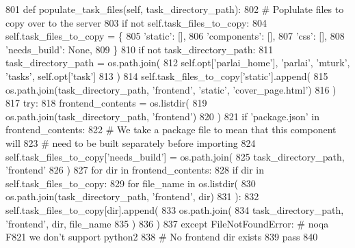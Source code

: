 \begin{DoxyCode}
801     \textcolor{keyword}{def }populate\_task\_files(self, task\_directory\_path):
802         \textcolor{comment}{# Poplulate files to copy over to the server}
803         \textcolor{keywordflow}{if} \textcolor{keywordflow}{not} self.task\_files\_to\_copy:
804             self.task\_files\_to\_copy = \{
805                 \textcolor{stringliteral}{'static'}: [],
806                 \textcolor{stringliteral}{'components'}: [],
807                 \textcolor{stringliteral}{'css'}: [],
808                 \textcolor{stringliteral}{'needs\_build'}: \textcolor{keywordtype}{None},
809             \}
810         \textcolor{keywordflow}{if} \textcolor{keywordflow}{not} task\_directory\_path:
811             task\_directory\_path = os.path.join(
812                 self.opt[\textcolor{stringliteral}{'parlai\_home'}], \textcolor{stringliteral}{'parlai'}, \textcolor{stringliteral}{'mturk'}, \textcolor{stringliteral}{'tasks'}, self.opt[\textcolor{stringliteral}{'task'}]
813             )
814         self.task\_files\_to\_copy[\textcolor{stringliteral}{'static'}].append(
815             os.path.join(task\_directory\_path, \textcolor{stringliteral}{'frontend'}, \textcolor{stringliteral}{'static'}, \textcolor{stringliteral}{'cover\_page.html'})
816         )
817         \textcolor{keywordflow}{try}:
818             frontend\_contents = os.listdir(
819                 os.path.join(task\_directory\_path, \textcolor{stringliteral}{'frontend'})
820             )
821             \textcolor{keywordflow}{if} \textcolor{stringliteral}{'package.json'} \textcolor{keywordflow}{in} frontend\_contents:
822                 \textcolor{comment}{# We take a package file to mean that this component will}
823                 \textcolor{comment}{# need to be built separately before importing}
824                 self.task\_files\_to\_copy[\textcolor{stringliteral}{'needs\_build'}] = os.path.join(
825                     task\_directory\_path, \textcolor{stringliteral}{'frontend'}
826                 )
827             \textcolor{keywordflow}{for} dir \textcolor{keywordflow}{in} frontend\_contents:
828                 \textcolor{keywordflow}{if} dir \textcolor{keywordflow}{in} self.task\_files\_to\_copy:
829                     \textcolor{keywordflow}{for} file\_name \textcolor{keywordflow}{in} os.listdir(
830                         os.path.join(task\_directory\_path, \textcolor{stringliteral}{'frontend'}, dir)
831                     ):
832                         self.task\_files\_to\_copy[dir].append(
833                             os.path.join(
834                                 task\_directory\_path, \textcolor{stringliteral}{'frontend'}, dir, file\_name
835                             )
836                         )
837         \textcolor{keywordflow}{except} FileNotFoundError:  \textcolor{comment}{# noqa F821 we don't support python2}
838             \textcolor{comment}{# No frontend dir exists}
839             \textcolor{keywordflow}{pass}
840 
\end{DoxyCode}
